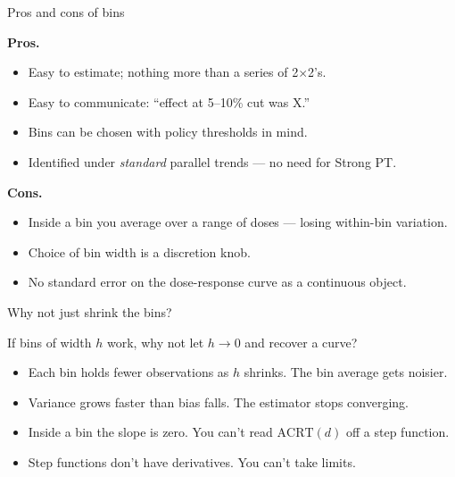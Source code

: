 \documentclass[aspectratio=169,12pt,t]{beamer}
\begin{document}
\begin{frame}{Pros and cons of bins}
\vspace{0.1cm}

\textbf{Pros.}
\begin{itemize}\footnotesize\setlength\itemsep{0pt}
  \item Easy to estimate; nothing more than a series of 2$\times$2's.
  \item Easy to communicate: ``effect at 5--10\% cut was X.''
  \item Bins can be chosen with policy thresholds in mind.
  \item Identified under \textit{standard} parallel trends --- no need for Strong PT.
\end{itemize}

\vspace{0.3cm}

\textbf{Cons.}
\begin{itemize}\footnotesize\setlength\itemsep{0pt}
  \item Inside a bin you average over a range of doses --- losing within-bin variation.
  \item Choice of bin width is a discretion knob.
  \item No standard error on the dose-response curve as a continuous object.
\end{itemize}

\vspace{0.3em}
\end{frame}

\begin{frame}{Why not just shrink the bins?}
\vspace{0.6em}

If bins of width $h$ work, why not let $h \to 0$ and recover a curve?

\vspace{1em}

\begin{itemize}\setlength\itemsep{0.5em}
  \item Each bin holds fewer observations as $h$ shrinks. \;The bin average gets noisier.
  \item Variance grows faster than bias falls. \;The estimator stops converging.
  \item Inside a bin the slope is zero. \;You can't read $\text{ACRT}(d)$ off a step function.
  \item Step functions don't have derivatives. \;You can't take limits.
\end{itemize}

\vspace{0.6em}
\begin{center}
\end{center}
\end{frame}
\end{document}

